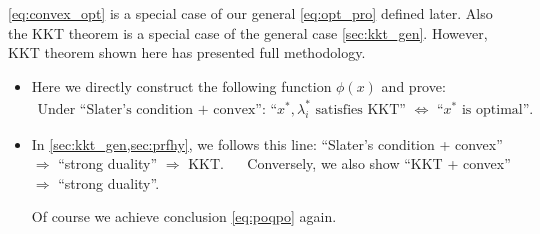 \documentclass{article}
\begin{document}
\begin{rema}\label{rem:qarghzcv}
\cref{eq:convex_opt} is a special case of our general \cref{eq:opt_pro} defined later. Also the KKT theorem is a special case of the general case \cref{sec:kkt_gen}. However, KKT theorem shown here has presented full methodology.
\begin{itemize}
    \item Here we directly construct the following function $\phi(x)$ and prove: 
    \begin{align}
        \text{Under ``Slater's condition + convex'': ``$x^*,\lambda_i^*$  satisfies KKT'' $\Longleftrightarrow$ ``$x^*$ is optimal''.}\label{eq:poqpo}
    \end{align}
    \item In \cref{sec:kkt_gen,sec:prfhy}, we follows this line: ``Slater's condition + convex'' $\Longrightarrow$ ``strong duality'' $\Longrightarrow$ KKT. $\quad$ Conversely, we also show  ``KKT + convex'' $\Longrightarrow$ ``strong duality''. 
    
    Of course we achieve conclusion \cref{eq:poqpo} again.
    
    
\end{itemize}
\end{rema}
\end{document}
